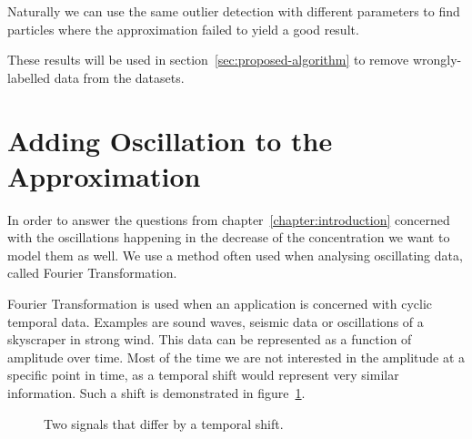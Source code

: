 Naturally we can use the same outlier detection with different parameters to find particles where the approximation failed to yield a good result.

These results will be used in section~\ref{sec:proposed-algorithm} to remove wrongly-labelled data from the datasets.

\section{Adding Oscillation to the Approximation}
\label{sec:adding_oscillation_to_the_approximation}

In order to answer the questions from chapter~\ref{chapter:introduction} concerned with the oscillations  happening in the decrease of the \Calcium concentration we want to model them as well. We use a method often used when analysing oscillating data, called Fourier Transformation.

Fourier Transformation is used when an application is concerned with cyclic temporal data. Examples are sound waves, seismic data or oscillations of a skyscraper in strong wind. This data can be represented as a function of amplitude over time. Most of the time we are not interested in the amplitude at a specific point in time, as a temporal shift would represent very similar information. Such a shift is demonstrated in figure~\ref{fig:tempoal_shift}.

\begin{figure}[h]
	\centering
	
	\begin{subfigure}[b]{\textwidth}
	\end{subfigure}
	
	\caption{Two signals that differ by a temporal shift.}
	\label{fig:tempoal_shift}
\end{figure}

